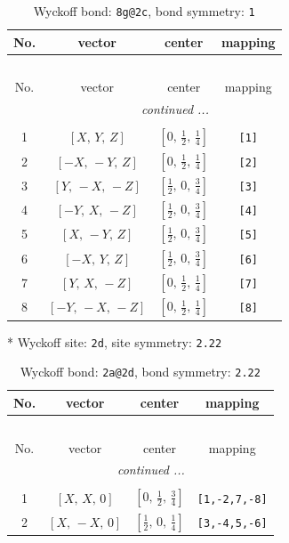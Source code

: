 \documentclass[fleqn,8pt]{jsarticle}
\begin{document}
\begin{longtable}{cccc}
\caption{Wyckoff bond: {\tt 8g@2c}, bond symmetry: {\tt 1}}
 \\
 \hline \hline
No. & vector & center & mapping \\ \hline \endfirsthead

\multicolumn{3}{l}{\tablename\ \thetable{}} \\
 \hline \hline
No. & vector & center & mapping \\ \hline \endhead

 \hline \hline
\multicolumn{3}{r}{\footnotesize\it continued ...} \\ \endfoot

 \hline \hline
\multicolumn{3}{r}{} \\ \endlastfoot

1 & $\left[ X,\, Y,\, Z \right]$ & $\left[ 0,\, \frac{1}{2},\, \frac{1}{4} \right]$ & {\tt [1]} \\ \hline
2 & $\left[ - X,\, - Y,\, Z \right]$ & $\left[ 0,\, \frac{1}{2},\, \frac{1}{4} \right]$ & {\tt [2]} \\ \hline
3 & $\left[ Y,\, - X,\, - Z \right]$ & $\left[ \frac{1}{2},\, 0,\, \frac{3}{4} \right]$ & {\tt [3]} \\ \hline
4 & $\left[ - Y,\, X,\, - Z \right]$ & $\left[ \frac{1}{2},\, 0,\, \frac{3}{4} \right]$ & {\tt [4]} \\ \hline
5 & $\left[ X,\, - Y,\, Z \right]$ & $\left[ \frac{1}{2},\, 0,\, \frac{3}{4} \right]$ & {\tt [5]} \\ \hline
6 & $\left[ - X,\, Y,\, Z \right]$ & $\left[ \frac{1}{2},\, 0,\, \frac{3}{4} \right]$ & {\tt [6]} \\ \hline
7 & $\left[ Y,\, X,\, - Z \right]$ & $\left[ 0,\, \frac{1}{2},\, \frac{1}{4} \right]$ & {\tt [7]} \\ \hline
8 & $\left[ - Y,\, - X,\, - Z \right]$ & $\left[ 0,\, \frac{1}{2},\, \frac{1}{4} \right]$ & {\tt [8]} \\
\end{longtable}
* Wyckoff site: {\tt 2d}, site symmetry: {\tt 2.22}
\renewcommand{\arraystretch}{1.2}
\begin{longtable}{cccc}
\caption{Wyckoff bond: {\tt 2a@2d}, bond symmetry: {\tt 2.22}}
 \\
 \hline \hline
No. & vector & center & mapping \\ \hline \endfirsthead

\multicolumn{3}{l}{\tablename\ \thetable{}} \\
 \hline \hline
No. & vector & center & mapping \\ \hline \endhead

 \hline \hline
\multicolumn{3}{r}{\footnotesize\it continued ...} \\ \endfoot

 \hline \hline
\multicolumn{3}{r}{} \\ \endlastfoot

1 & $\left[ X,\, X,\, 0 \right]$ & $\left[ 0,\, \frac{1}{2},\, \frac{3}{4} \right]$ & {\tt [1,-2,7,-8]} \\ \hline
2 & $\left[ X,\, - X,\, 0 \right]$ & $\left[ \frac{1}{2},\, 0,\, \frac{1}{4} \right]$ & {\tt [3,-4,5,-6]} \\
\end{longtable}
\end{document}
